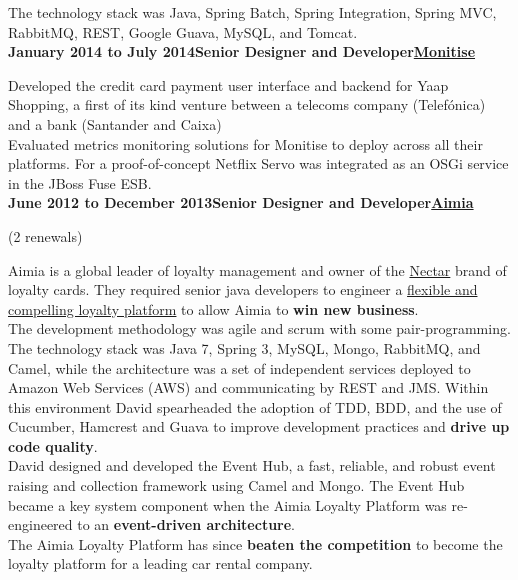 \documentclass[a4paper,12pt]{article}
\newcommand{\clientwork}[3]{\textbf{#1\hfill#3\hfill#2}\nopagebreak}
\newcommand{\renewals}[2]{(#2)\nopagebreak}
\begin{document}
The technology stack was Java, Spring Batch, Spring Integration, Spring MVC, RabbitMQ, REST, Google Guava, MySQL, and Tomcat.\\

\clientwork{January 2014 to July 2014}{\href{http://www.monitise.com/}{Monitise}}{Senior Designer and Developer}

Developed the credit card payment user interface and backend for Yaap Shopping, a first of its kind venture between a telecoms company (Telef\'onica) and a bank (Santander and Caixa)\\

Evaluated metrics monitoring solutions for Monitise to deploy across all their platforms. For a proof-of-concept Netflix Servo was integrated as an OSGi service in the JBoss Fuse ESB.\\

\clientwork{June 2012 to December 2013}{\href{http://www.aimia.com/}{Aimia}}{Senior Designer and Developer}

\renewals{18 months}{2 renewals}

Aimia is a global leader of loyalty management and owner of the \href{http://www.nectar.com/}{Nectar} brand of loyalty cards. They required senior java developers to engineer a \href{https://www.aimia.com/our-businesses/insight-and-loyalty-solutions/aimia-loyalty/}{flexible and compelling loyalty platform} to allow Aimia to \textbf{win new business}.\\

The development methodology was agile and scrum with some pair-programming.  The technology stack was Java 7, Spring 3, MySQL, Mongo, RabbitMQ, and Camel, while the architecture was a set of independent services deployed to Amazon Web Services (AWS) and communicating by REST and JMS. Within this environment David spearheaded the adoption of TDD, BDD, and the use of Cucumber, Hamcrest and Guava to improve development practices and \textbf{drive up code quality}.\\

David designed and developed the Event Hub, a fast, reliable, and robust event raising and collection framework using Camel and Mongo. The Event Hub became a key system component when the Aimia Loyalty Platform was re-engineered to an \textbf{event-driven architecture}.\\


The Aimia Loyalty Platform has since \textbf{beaten the competition} to become the loyalty platform for a leading car rental company.\\
\end{document}
